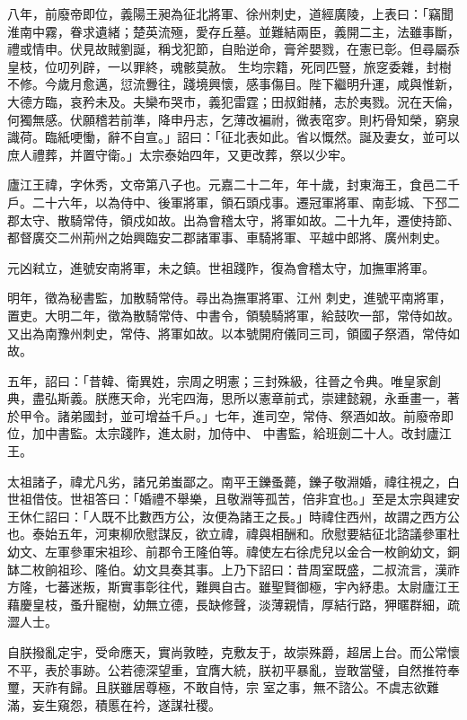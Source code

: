 \begin{pinyinscope}
 八年，前廢帝即位，義陽王昶為征北將軍、徐州刺史，道經廣陵，上表曰：「竊聞淮南中霧，眷求遺緒；楚英流殛，愛存丘墓。並難結兩臣，義開二主，法雖事斷，禮或情申。伏見故賊劉誕，稱戈犯節，自貽逆命，膏斧嬰戮，在憲已彰。但尋屬忝皇枝，位叨列辟，一以罪終，魂骸莫赦。
 生均宗籍，死同匹豎，旅窆委雜，封樹不修。今歲月愈邁，愆流釁往，踐境興懷，感事傷目。陛下繼明升運，咸與惟新，大德方臨，哀矜未及。夫欒布哭市，義犯雷霆；田叔鉗赭，志於夷戮。況在天倫，何獨無感。伏願稽若前準，降申丹志，乞薄改褊祔，微表窀穸。則朽骨知榮，窮泉識荷。臨紙哽慟，辭不自宣。」詔曰：「征北表如此。省以慨然。誕及妻女，並可以庶人禮葬，并置守衛。」太宗泰始四年，又更改葬，祭以少牢。



 廬江王禕，字休秀，文帝第八子也。元嘉二十二年，年十歲，封東海王，食邑二千戶。二十六年，以為侍中、後軍將軍，領石頭戍事。遷冠軍將軍、南彭城、下邳二郡太守、散騎常侍，領戍如故。出為會稽太守，將軍如故。二十九年，遷使持節、都督廣交二州荊州之始興臨安二郡諸軍事、車騎將軍、平越中郎將、廣州刺史。



 元凶弒立，進號安南將軍，未之鎮。世祖踐阼，復為會稽太守，加撫軍將軍。



 明年，徵為秘書監，加散騎常侍。尋出為撫軍將軍、江州
 刺史，進號平南將軍，置吏。大明二年，徵為散騎常侍、中書令，領驍騎將軍，給鼓吹一部，常侍如故。又出為南豫州刺史，常侍、將軍如故。以本號開府儀同三司，領國子祭酒，常侍如故。



 五年，詔曰：「昔韓、衛異姓，宗周之明憲；三封殊級，往晉之令典。唯皇家創典，盡弘斯義。朕應天命，光宅四海，思所以憲章前式，崇建懿親，永垂畫一，著於甲令。諸弟國封，並可增益千戶。」七年，進司空，常侍、祭酒如故。前廢帝即位，加中書監。太宗踐阼，進太尉，加侍中、
 中書監，給班劍二十人。改封廬江王。



 太祖諸子，禕尤凡劣，諸兄弟蚩鄙之。南平王鑠蚤薨，鑠子敬淵婚，禕往視之，白世祖借伎。世祖答曰：「婚禮不舉樂，且敬淵等孤苦，倍非宜也。」至是太宗與建安王休仁詔曰：「人既不比數西方公，汝便為諸王之長。」時禕住西州，故謂之西方公也。泰始五年，河東柳欣慰謀反，欲立禕，禕與相酬和。欣慰要結征北諮議參軍杜幼文、左軍參軍宋祖珍、前郡令王隆伯等。禕使左右徐虎兒以金合一枚餉幼文，銅
 缽二枚餉祖珍、隆伯。幼文具奏其事。上乃下詔曰：昔周室既盛，二叔流言，漢祚方隆，七蕃迷叛，斯實事彰往代，難興自古。雖聖賢御極，宇內紓患。太尉廬江王藉慶皇枝，蚤升寵樹，幼無立德，長缺修聲，淡薄親情，厚結行路，狎暱群細，疏澀人士。



 自朕撥亂定宇，受命應天，實尚敦睦，克敷友于，故崇殊爵，超居上台。而公常懷不平，表於事跡。公若德深望重，宜膺大統，朕初平暴亂，豈敢當璧，自然推符奉璽，天祚有歸。且朕雖居尊極，不敢自恃，宗
 室之事，無不諮公。不虞志欲難滿，妄生窺怨，積慝在衿，遂謀社稷。




\end{pinyinscope}
